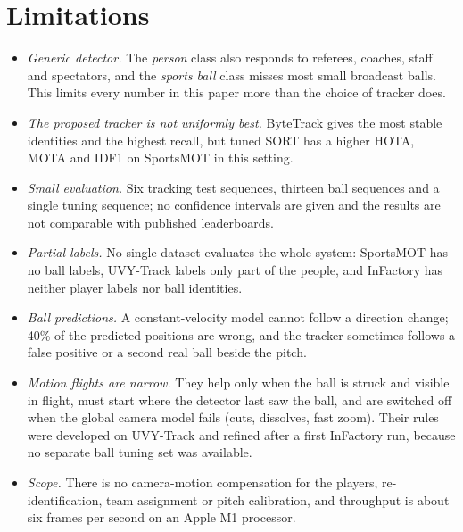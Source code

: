 \documentclass[conference]{IEEEtran}
\begin{document}
\section{Limitations}
\begin{itemize}
\item \emph{Generic detector.} The \emph{person} class also responds to referees,
coaches, staff and spectators, and the \emph{sports ball} class misses most small
broadcast balls. This limits every number in this paper more than the choice of
tracker does.
\item \emph{The proposed tracker is not uniformly best.} ByteTrack gives the most
stable identities and the highest recall, but tuned SORT has a higher HOTA, MOTA
and IDF1 on SportsMOT in this setting.
\item \emph{Small evaluation.} Six tracking test sequences, thirteen ball
sequences and a single tuning sequence; no confidence intervals are given and the
results are not comparable with published leaderboards.
\item \emph{Partial labels.} No single dataset evaluates the whole system:
SportsMOT has no ball labels, UVY-Track labels only part of the people, and
InFactory has neither player labels nor ball identities.
\item \emph{Ball predictions.} A constant-velocity model cannot follow a direction
change; 40\% of the predicted positions are wrong, and the tracker sometimes
follows a false positive or a second real ball beside the pitch.
\item \emph{Motion flights are narrow.} They help only when the ball is struck and
visible in flight, must start where the detector last saw the ball, and are
switched off when the global camera model fails (cuts, dissolves, fast zoom).
Their rules were developed on UVY-Track and refined after a first InFactory run,
because no separate ball tuning set was available.
\item \emph{Scope.} There is no camera-motion compensation for the players,
re-identification, team assignment or pitch calibration, and throughput is about
six frames per second on an Apple M1 processor.
\end{itemize}

\end{document}
